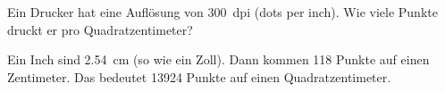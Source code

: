 
\begin{aufgabe}
	Ein Drucker hat eine Auflösung von \SI{300}{dpi} (dots per inch). 
	Wie viele Punkte druckt er pro Quadratzentimeter?


	\begin{loesung}
		Ein Inch sind \SI{2.54}{cm} (so wie ein Zoll). Dann kommen 118 Punkte auf einen Zentimeter.
		Das bedeutet \num{13924} Punkte auf einen Quadratzentimeter.
	\end{loesung}
\end{aufgabe}
